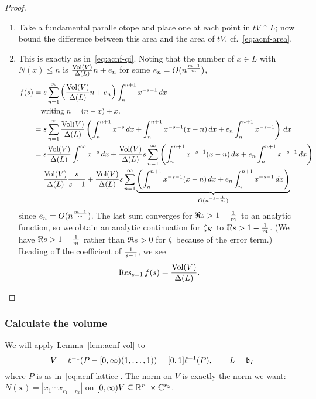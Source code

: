 \begin{proof}
\begin{enumerate}
\item
Take a fundamental parallelotope and place one at each point in $tV\cap L$; now bound the difference between this area and the area of $tV$, cf.~\eqref{eq:acnf-area}.
\item
This is exactly as in~\eqref{eq:acnf-qi}. 
Noting that the number of $x\in L$ with $N(x)\le n$ is $\frac{\text{Vol}(V)}{\Delta(L)}n+e_n$ for some $e_n=O(n^{\frac{m-1}{m}})$,
\begin{align*}
f(s)
&=s\sum_{n=1}^{\infty}\left( {\frac{\text{Vol}(V)}{\Delta(L)}n+e_n} \right)\int_{n}^{n+1} x^{-s-1}\,dx\\
\nonumber
&\quad\text{writing $n=(n-x)+x$},\\
\nonumber
&=s\sum_{n=1}^{\infty}\frac{\text{Vol}(V)}{\Delta(L)} \left( {\int_{n}^{n+1} x^{-s}\,dx+\int_n^{n+1}x^{-s-1}(x-n)\,dx+e_n\int_n^{n+1}x^{-s-1}} \right)\,dx\\
\nonumber
&=s\frac{\text{Vol}(V)}{\Delta(L)}\int_1^{\infty} x^{-s}\,dx+\frac{\text{Vol}(V)}{\Delta(L)}s\sum_{n=1}^{\infty}\left( {\int_n^{n+1}x^{-s-1}(x-n)\,dx+e_n\int_n^{n+1}x^{-s-1}\,dx} \right)\\
\nonumber
&=\frac{\text{Vol}(V)}{\Delta(L)} \frac{s}{s-1} +\frac{\text{Vol}(V)}{\Delta(L)} s\sum_{n=1}^{\infty}\underbrace{\left( {\int_n^{n+1}x^{-s-1}(x-n)\,dx+e_n\int_n^{n+1}x^{-s-1}\,dx} \right)}_{O(n^{-s-\frac{1}{m}})}
\end{align*}
since $e_n=O(n^{\frac{m-1}{m}})$. The last sum converges for $\Re s> 1-\frac{1}{m}$ to an analytic function, so we obtain an analytic continuation for $\zeta_K$ to $\Re s>1-\frac{1}{m}$. (We have $\Re s>1-\frac{1}{m}$ rather than $\Re s>0$ for $\zeta$ because of the error term.) Reading off the coefficient of $\frac{1}{s-1}$, we see
\[
{\operatorname{Res}_{s=1}f(s)=\frac{\text{Vol}(V)}{\Delta(L)}}.\qedhere
\] 
\end{enumerate}
\end{proof}

\subsubsection{Calculate the volume}
We will apply Lemma~\ref{lem:acnf-vol} to \[V=
\ell^{-1}(P-[0,\infty)(1,\ldots, 1))=[0,1]\ell^{-1}(P),\qquad L=\mathfrak{b}_I \] where $P$ is as in~\eqref{eq:acnf-lattice}.
The norm on $V$ is exactly the norm we want: $N(\mathbf x)=|x_1\cdots x_{r_1+r_2}|$ on $[0,\infty)V\subseteq \mathbb{R}^{r_1}\times \mathbb{C}^{r_2}$.

